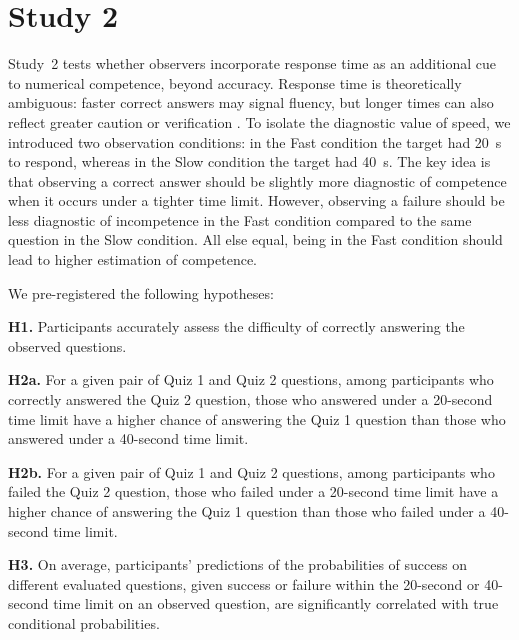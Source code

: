\documentclass[10pt,letterpaper]{article}
\begin{document}

\section{Study 2}\label{study-2}

Study~2 tests whether observers incorporate response time as an additional cue to numerical competence, beyond accuracy. Response time is theoretically ambiguous: faster correct answers may signal fluency, but longer times can also reflect greater caution or verification \citep{Hedge-2018,Goldhammer-2011,Richardson-2022,Berke-2023}. To isolate the diagnostic value of speed, we introduced two observation conditions: in the Fast condition the target had 20~s to respond, whereas in the Slow condition the target had 40~s. The key idea is that observing a correct answer should be slightly more diagnostic of competence when it occurs under a tighter time limit. However, observing a failure should be less diagnostic of incompetence in the Fast condition compared to the same question in the Slow condition. All else equal, being in the Fast condition should lead to higher estimation of competence.

We pre-registered the following hypotheses:

\textbf{H1.} Participants accurately assess the difficulty of correctly answering the observed questions.

\textbf{H2a.} For a given pair of Quiz 1 and Quiz 2 questions, among participants who correctly answered the Quiz 2 question, those who answered under a 20-second time limit have a higher chance of answering the Quiz 1 question than those who answered under a 40-second time limit.

\textbf{H2b.} For a given pair of Quiz 1 and Quiz 2 questions, among participants who failed the Quiz 2 question, those who failed under a 20-second time limit have a higher chance of answering the Quiz 1 question than those who failed under a 40-second time limit.

\textbf{H3.} On average, participants' predictions of the probabilities of success on different evaluated questions, given success or failure within the 20-second or 40-second time limit on an observed question, are significantly correlated with true conditional probabilities.
\end{document}
